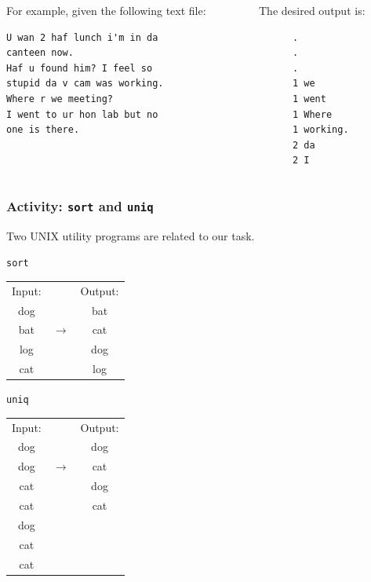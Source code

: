 \begin{frame}[fragile]
\begin{columns}
\begin{column}{0.5\textwidth}
For example, given the following text file:
\begin{verbatim}
U wan 2 haf lunch i'm in da 
canteen now.
Haf u found him? I feel so 
stupid da v cam was working.
Where r we meeting?
I went to ur hon lab but no 
one is there.
\end{verbatim}
\end{column}
\begin{column}{0.5\textwidth}
The desired output is:
\begin{verbatim}
      .
      .
      .
      1 we
      1 went
      1 Where
      1 working.
      2 da
      2 I
\end{verbatim}
\end{column}
\end{columns}
\end{frame}


\begin{frame}[fragile]
\frametitle{Activity: \texttt{sort} and \texttt{uniq}}
Two UNIX utility programs are related to our task.  

\begin{block}{\texttt{sort}}
\begin{tabular}{c c c}
Input: & & Output: \\
dog    & & bat \\
bat    &$\longrightarrow$& cat \\
log    & & dog \\
cat    & & log \\
\end{tabular}
\end{block}

\begin{block}{\texttt{uniq}}
\begin{tabular}{c c c}
Input: & & Output: \\
dog    & & dog \\
dog    &$\longrightarrow$& cat \\
cat    & & dog \\
cat    & & cat \\
dog    & & \\
cat    & & \\
cat    & & \\
\end{tabular}
\end{block}
\end{frame}

